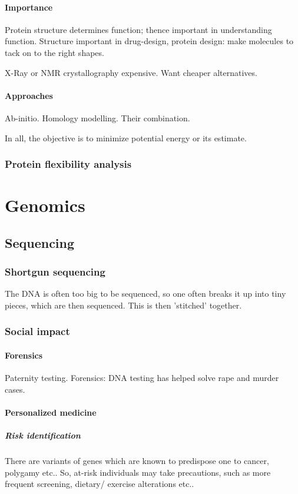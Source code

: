 \documentclass[oneside, article]{memoir}
\begin{document}
\subsection{Importance}
Protein structure determines function; thence important in understanding function. Structure important in drug-design, protein design: make molecules to tack on to the right shapes.

X-Ray or NMR crystallography expensive. Want cheaper alternatives.

\subsection{Approaches}
Ab-initio. Homology modelling. Their combination.

In all, the objective is to minimize potential energy or its estimate.

\section{Protein flexibility analysis}

\part{Genomics}
\chapter{Sequencing}
\section{Shortgun sequencing}
The DNA is often too big to be sequenced, so one often breaks it up into tiny pieces, which are then sequenced. This is then 'stitched' together.

\section{Social impact}
\subsection{Forensics}
Paternity testing. Forensics: DNA testing has helped solve rape and murder cases.

\subsection{Personalized medicine}
\subsubsection{Risk identification}
There are variants of genes which are known to predispose one to cancer, polygamy etc.. So, at-risk individuals may take precautions, such as more frequent screening, dietary/ exercise alterations etc..
\end{document}

